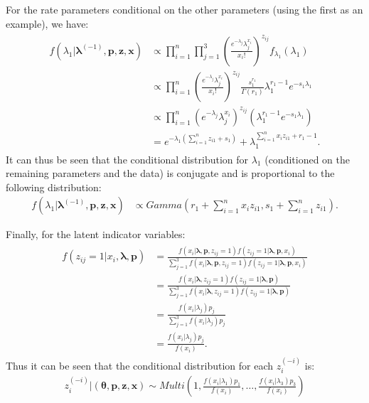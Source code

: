 \begin{DoubleSpace*}
For the rate parameters conditional on the other parameters (using the first as an example), we have:
\begin{align}
\begin{split}
	f(\lambda_1|\boldsymbol{\lambda}^{(-1)},\textbf{p},\textbf{z},\textbf{x})&\propto \prod_{i=1}^{n} \prod_{j=1}^3 \left(\frac{e^{-\lambda_j}\lambda_j^{x_i}}{x_i!}\right)^{z_{ij}} f_{\lambda_1}(\lambda_1) \\
	&\propto \prod_{i=1}^{n} \left(\frac{e^{-\lambda_j}\lambda_j^{x_i}}{x_i!}\right)^{z_{ij}} \frac{s_1^{r_1}}{\Gamma(r_1)} \lambda_1^{r_1-1} e^{-s_1 \lambda_1}\\
	&\propto \prod_{i=1}^{n} \left( e^{-\lambda_j}\lambda_j^{x_i} \right)^{z_{ij}} \left( \lambda_1^{r_1-1} e^{-s_1 \lambda_1} \right) \\
	&= e^{-\lambda_1 (\sum_{i=1}^n z_{i1}+s_1)}+\lambda_1^{\sum_{i=1}^n x_i z_{i1}+r_1-1}.
\end{split}
\end{align}
It can thus be seen that the conditional distribution for $\lambda_1$ (conditioned on the remaining parameters and the data) is conjugate and is proportional to the following distribution:
\begin{align}
		f(\lambda_1|\boldsymbol{\lambda}^{(-1)},\textbf{p},\textbf{z},\textbf{x})&\propto Gamma \left( r_1+\sum_{i=1}^n x_i z_{i1}, s_1+\sum_{i=1}^n z_{i1} \right). 
\end{align}

Finally, for the latent indicator variables:
\begin{align}
	\begin{split}
f(z_{ij}=1|x_i,\boldsymbol{\lambda},\textbf{p})&=
\frac{f(x_i|\boldsymbol{\lambda},\textbf{p},z_{ij}=1)f(z_{ij}=1|\boldsymbol{\lambda},\textbf{p},x_i)}{\sum_{j=1}^3 f(x_i|\boldsymbol{\lambda},\textbf{p},z_{ij}=1)f(z_{ij}=1|\boldsymbol{\lambda},\textbf{p},x_i)} \\
&=\frac{f(x_i|\boldsymbol{\lambda},z_{ij}=1)f(z_{ij}=1|\boldsymbol{\lambda},\textbf{p})}{\sum_{j=1}^3 f(x_i|\boldsymbol{\lambda},z_{ij}=1)f(z_{ij}=1|\boldsymbol{\lambda},\textbf{p})} \\
&=\frac{f(x_i|\lambda_j)p_j}{\sum_{j=1}^3 f(x_i|\lambda_j)p_j} \\
&= \frac{f(x_i|\lambda_j)p_j}{ f(x_i)}.
	\end{split}
\end{align}
Thus it can be seen that the conditional distribution for each $z_i^{(-i)}$ is:
\begin{align}
	z_i^{(-i)} |(\boldsymbol{\theta},\textbf{p},\textbf{z},\textbf{x} )\sim Multi \left(1,\frac{f(x_i|\lambda_1)p_1}{ f(x_i)},\hdots , \frac{f(x_i|\lambda_3)p_3}{ f(x_i)} \right)
\end{align}

\end{DoubleSpace*}